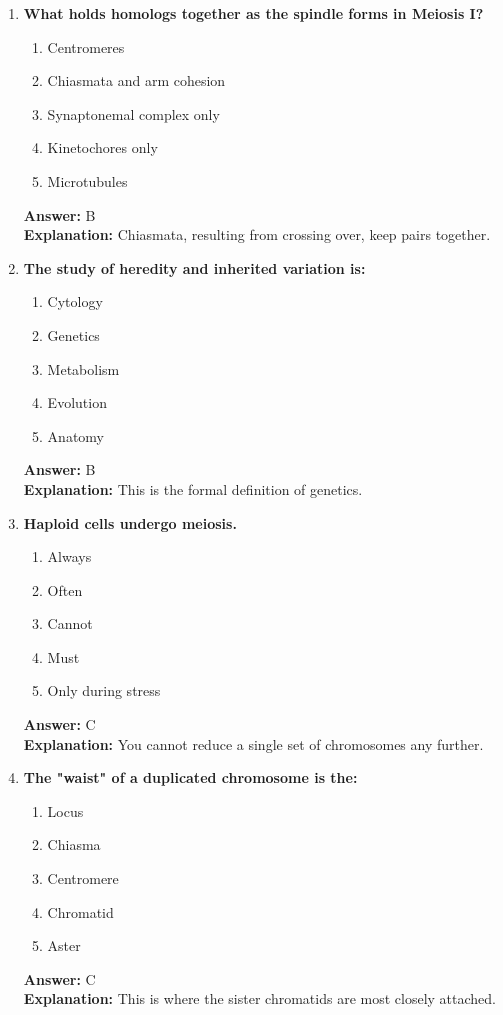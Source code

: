 \documentclass[11pt, a4paper]{article}
\begin{document}
\begin{enumerate}[leftmargin=*, label=\arabic*.]
\item \textbf{What holds homologs together as the spindle forms in Meiosis I?}
\begin{enumerate}[label=\Alph*.]
\item Centromeres
\item Chiasmata and arm cohesion
\item Synaptonemal complex only
\item Kinetochores only
\item Microtubules
\end{enumerate}
\textbf{Answer:} B \\
\textbf{Explanation:} Chiasmata, resulting from crossing over, keep pairs together.

\item \textbf{The study of heredity and inherited variation is:}
\begin{enumerate}[label=\Alph*.]
\item Cytology
\item Genetics
\item Metabolism
\item Evolution
\item Anatomy
\end{enumerate}
\textbf{Answer:} B \\
\textbf{Explanation:} This is the formal definition of genetics.

\item \textbf{Haploid cells \underline{\hspace{1cm}} undergo meiosis.}
\begin{enumerate}[label=\Alph*.]
\item Always
\item Often
\item Cannot
\item Must
\item Only during stress
\end{enumerate}
\textbf{Answer:} C \\
\textbf{Explanation:} You cannot reduce a single set of chromosomes any further.

\item \textbf{The "waist" of a duplicated chromosome is the:}
\begin{enumerate}[label=\Alph*.]
\item Locus
\item Chiasma
\item Centromere
\item Chromatid
\item Aster
\end{enumerate}
\textbf{Answer:} C \\
\textbf{Explanation:} This is where the sister chromatids are most closely attached.


\end{enumerate}
\end{document}
